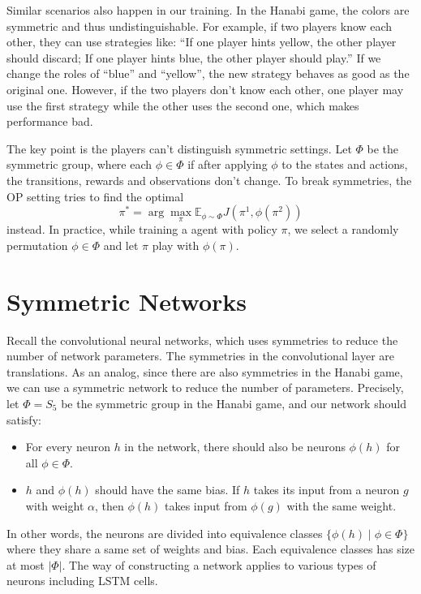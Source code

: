\documentclass[12pt]{article}
\begin{document}
\begin{spacing}{1.15}
Similar scenarios also happen in our training. In the Hanabi game, the colors are symmetric and thus undistinguishable. For example, if two players know each other, they can use strategies like: ``If one player hints yellow, the other player should discard; If one player hints blue, the other player should play.'' If we change the roles of ``blue'' and ``yellow'', the new strategy behaves as good as the original one. However, if the two players don't know each other, one player may use the first strategy while the other uses the second one, which makes performance bad.

The key point is the players can't distinguish symmetric settings. Let $\Phi$ be the symmetric group, where each $\phi\in \Phi$ if after applying $\phi$ to the states and actions, the transitions, rewards and observations don't change. To break symmetries, the OP setting tries to find the optimal \[\pi^* = \arg \max_{\pi} \mathbb{E}_{\phi\sim \Phi} J(\pi^1, \phi(\pi^2))\] instead. In practice, while training a agent with policy $\pi$, we select a randomly permutation $\phi\in \Phi$ and let $\pi$ play with $\phi(\pi)$.

\section{Symmetric Networks}
Recall the convolutional neural networks, which uses symmetries to reduce the number of network parameters. The symmetries in the convolutional layer are translations. As an analog, since there are also symmetries in the Hanabi game, we can use a symmetric network to reduce the number of parameters. Precisely, let $\Phi = S_5$ be the symmetric group in the Hanabi game, and our network should satisfy:

\begin{itemize}
\item For every neuron $h$ in the network, there should also be neurons $\phi(h)$ for all $\phi\in \Phi$.
\item $h$ and $\phi(h)$ should have the same bias. If $h$ takes its input from a neuron $g$ with weight $\alpha$, then $\phi(h)$ takes input from $\phi(g)$ with the same weight.
\end{itemize}

In other words, the neurons are divided into equivalence classes $\{\phi(h)\mid \phi \in \Phi\}$ where they share a same set of weights and bias. Each equivalence classes has size at most $|\Phi|$. The way of constructing a network applies to various types of neurons including LSTM cells.


\end{spacing}
\end{document}
